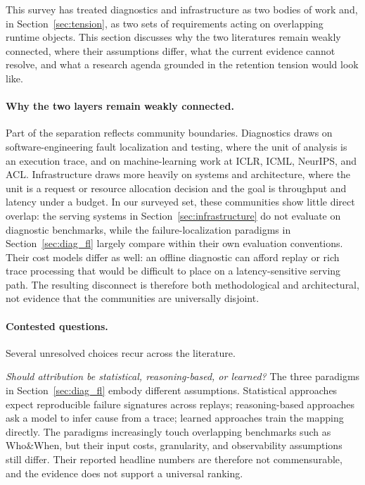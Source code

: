 This survey has treated diagnostics and infrastructure as two bodies of work and, in Section~\ref{sec:tension}, as two sets of requirements acting on overlapping runtime objects. This section discusses why the two literatures remain weakly connected, where their assumptions differ, what the current evidence cannot resolve, and what a research agenda grounded in the retention tension would look like.

\paragraph*{Why the two layers remain weakly connected.}
Part of the separation reflects community boundaries. Diagnostics draws on software-engineering fault localization and testing, where the unit of analysis is an execution trace, and on machine-learning work at ICLR, ICML, NeurIPS, and ACL. Infrastructure draws more heavily on systems and architecture, where the unit is a request or resource allocation decision and the goal is throughput and latency under a budget. In our surveyed set, these communities show little direct overlap: the serving systems in Section~\ref{sec:infrastructure} do not evaluate on diagnostic benchmarks, while the failure-localization paradigms in Section~\ref{sec:diag_fl} largely compare within their own evaluation conventions. Their cost models differ as well: an offline diagnostic can afford replay or rich trace processing that would be difficult to place on a latency-sensitive serving path. The resulting disconnect is therefore both methodological and architectural, not evidence that the communities are universally disjoint.

\paragraph*{Contested questions.}
Several unresolved choices recur across the literature.

\emph{Should attribution be statistical, reasoning-based, or learned?} The three paradigms in Section~\ref{sec:diag_fl} embody different assumptions. Statistical approaches expect reproducible failure signatures across replays; reasoning-based approaches ask a model to infer cause from a trace; learned approaches train the mapping directly. The paradigms increasingly touch overlapping benchmarks such as Who\&When, but their input costs, granularity, and observability assumptions still differ. Their reported headline numbers are therefore not commensurable, and the evidence does not support a universal ranking.

